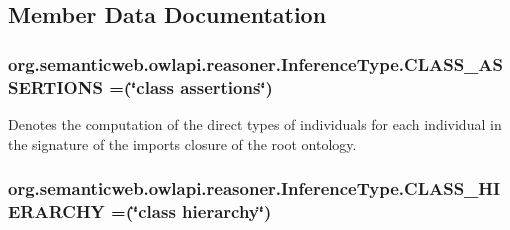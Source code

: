 \subsection{Member Data Documentation}
\hypertarget{enumorg_1_1semanticweb_1_1owlapi_1_1reasoner_1_1_inference_type_aee5a2b344afb43ec9952bdcc41599242}{
\subsubsection[{C\-L\-A\-S\-S\-\_\-\-A\-S\-S\-E\-R\-T\-I\-O\-N\-S}]{\setlength{\rightskip}{0pt plus 5cm}org.\-semanticweb.\-owlapi.\-reasoner.\-Inference\-Type.\-C\-L\-A\-S\-S\-\_\-\-A\-S\-S\-E\-R\-T\-I\-O\-N\-S =(\char`\"{}class assertions\char`\"{})}}\label{enumorg_1_1semanticweb_1_1owlapi_1_1reasoner_1_1_inference_type_aee5a2b344afb43ec9952bdcc41599242}
Denotes the computation of the direct types of individuals for each individual in the signature of the imports closure of the root ontology. \hypertarget{enumorg_1_1semanticweb_1_1owlapi_1_1reasoner_1_1_inference_type_a0a8d1458b4a14688930f339376eb22ae}{
\subsubsection[{C\-L\-A\-S\-S\-\_\-\-H\-I\-E\-R\-A\-R\-C\-H\-Y}]{\setlength{\rightskip}{0pt plus 5cm}org.\-semanticweb.\-owlapi.\-reasoner.\-Inference\-Type.\-C\-L\-A\-S\-S\-\_\-\-H\-I\-E\-R\-A\-R\-C\-H\-Y =(\char`\"{}class hierarchy\char`\"{})}}\label{enumorg_1_1semanticweb_1_1owlapi_1_1reasoner_1_1_inference_type_a0a8d1458b4a14688930f339376eb22ae}
